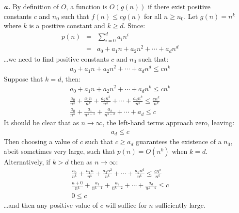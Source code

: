 \noindent\begin{enumerate}
	\item[\textbf{\textit{a.}}] By definition of $O$, a function is $O(g(n))$ if there exist positive constants $c$ and $n_0$ such that $f(n) \leq c g(n)$ for all $n \geq n_0$. Let $g(n) = n^k$ where $k$ is a positive constant and $k \geq d$. Since:
		\begin{eqnarray*}
			p(n) & = & \sum_{i=0}^d a_i n^i \\
			& = & a_0 + a_1 n + a_2 n^2 + \cdots + a_d n^d
		\end{eqnarray*}
		\ldots we need to find positive constants $c$ and $n_0$ such that:
		\begin{eqnarray*}
			a_0 + a_1 n + a_2 n^2 + \cdots + a_d n^d \leq c n^k
		\end{eqnarray*}
		Suppose that $k = d$, then:
		\begin{eqnarray*}
			a_0 + a_1 n + a_2 n^2 + \cdots + a_d n^k \leq c n^k \\
			\frac{a_0}{n^k} + \frac{a_1 n}{n^k} + \frac{a_2 n^2}{n^k} + \cdots + \frac{a_d n^k}{n^k} \leq \frac{c n^k}{n^k} \\
			\frac{a_0}{n^k} + \frac{a_1}{n^{k-1}} + \frac{a_2}{n^{k-2}} + \cdots + a_d \leq c
		\end{eqnarray*}
		It should be clear that as $n \rightarrow \infty$, the left-hand terms approach zero, leaving:
		\begin{eqnarray*}
			a_d \leq c
		\end{eqnarray*}
		Then choosing a value of $c$ such that $c \geq a_d$ guarantees the existence of a $n_0$, abeit sometimes very large, such that $p(n) = O(n^k)$ when $k = d$. Alternatively, if $k > d$ then as $n \rightarrow \infty$:
		\begin{eqnarray*}
			\frac{a_0}{n^k} + \frac{a_1 n}{n^k} + \frac{a_2 n^2}{n^k} + \cdots + \frac{a_d n^d}{n^k} \leq \frac{c n^k}{n^k} \\
			\frac{a+0}{n^k} + \frac{a_1}{n^{k-1}} + \frac{a_2}{n^{k-2}} + \cdots + \frac{a_d}{n^{k-d}} \leq c \\
			0 \leq c
		\end{eqnarray*}
		\ldots and then any positive value of $c$ will suffice for $n$ sufficiently large.
		

\end{enumerate}
